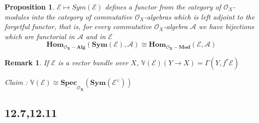 \documentclass{article}
\newtheorem{proposition}[theorem]{Proposition}
\newtheorem{remark}[theorem]{Remark}
\begin{document}
\begin{proposition}
$\mathcal E \mapsto Sym(\mathcal E )$ defines a functor from the category
of $\mathcal O_X$-modules into the category of commutative $\mathcal O_X$-algebras which is left adjoint to the
forgetful functor, that is, for every commutative $\mathcal O_X$-algebra $\mathcal A$ we have bijections which
are functorial in $\mathcal A$ and in $\mathcal E$
$$
\bm{Hom_{\mathcal O_X-Alg}(Sym(\mathcal E), \mathcal A) \cong Hom_{\mathcal O_X-Mod}(\mathcal E,\mathcal A)}
$$
\end{proposition}

\begin{remark}
    If $\mathcal E$ is a vector bundle over $X$, $\mathbb V(\mathcal E)(Y\to X)=\Gamma(Y,f^\ast\mathcal E)$

    Claim : $\bm{\mathbb V(\mathcal E)\cong\underline{Spec}_{\mathcal O_X}(Sym(\mathcal E^\vee))}$
\end{remark}





\newpage
\subsection{12.7,12.11}




\end{document}

